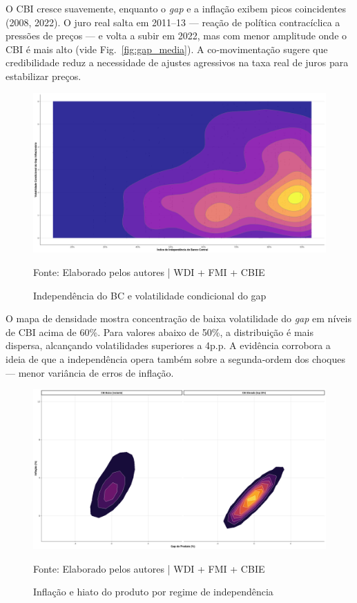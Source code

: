 \documentclass[a4paper,12pt]{article}
\begin{document}
O CBI cresce suavemente, enquanto o \textit{gap} e a inflação exibem picos coincidentes (2008, 2022).  
O juro real salta em 2011–13 — reação de política contracíclica a pressões de preços — e volta a subir em 2022, mas com menor amplitude onde o CBI é mais alto (vide Fig.~\ref{fig:gap_media}).  
A co‑movimentação sugere que credibilidade reduz a necessidade de ajustes agressivos na taxa real de juros para estabilizar preços.

\begin{figure}[H]
    \centering
    \caption{Independência do BC e volatilidade condicional do gap}
    \includegraphics[width=.85\linewidth]{Imagens/paperi11.png}
    \label{fig:egarch}

    \footnotesize{Fonte: Elaborado pelos autores | WDI + FMI + CBIE}
\end{figure}

O mapa de densidade mostra concentração de baixa volatilidade do \textit{gap} em níveis de CBI acima de 60\%.  
Para valores abaixo de 50\%, a distribuição é mais dispersa, alcançando volatilidades superiores a 4p.p.  
A evidência corrobora a ideia de que a independência opera também sobre a segunda‑ordem dos choques — menor variância de erros de inflação.

\begin{figure}[H]
    \centering
    \caption{Inflação e hiato do produto por regime de independência}
    \includegraphics[width=.85\linewidth]{Imagens/paperi12.png}
    \label{fig:philips_cbi}

    \footnotesize{Fonte: Elaborado pelos autores | WDI + FMI + CBIE}
\end{figure}
\end{document}
